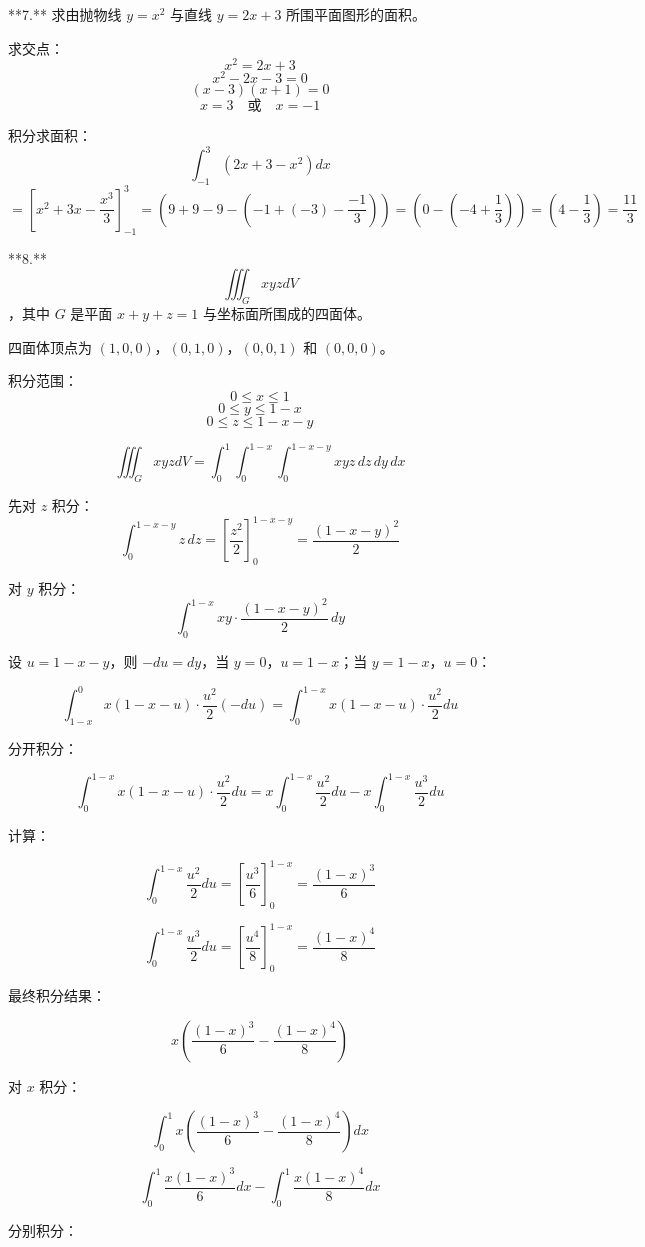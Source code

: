 **7.** 求由抛物线 \(y = x^2\) 与直线 \(y = 2x + 3\) 所围平面图形的面积。

求交点：
\[ x^2 = 2x + 3 \]
\[ x^2 - 2x - 3 = 0 \]
\[ (x - 3)(x + 1) = 0 \]
\[ x = 3 \quad \text{或} \quad x = -1 \]

积分求面积：
\[ \int_{-1}^3 (2x + 3 - x^2) dx \]
\[
= \left[ x^2 + 3x - \frac{x^3}{3} \right]_{-1}^3 
= \left(9 + 9 - 9 - (-1 + (-3) - \frac{-1}{3}) \right)
= \left(0 - (-4 + \frac{1}{3})\right)
= \left(4 - \frac{1}{3}\right)
= \frac{11}{3}
\]

**8.** \[ \iiint_G xyzdV \]，其中 \(G\) 是平面 \(x + y + z = 1\) 与坐标面所围成的四面体。

四面体顶点为 \((1,0,0)\)，\((0,1,0)\)，\((0,0,1)\) 和 \((0,0,0)\)。

积分范围：
\[ 0 \leq x \leq 1 \]
\[ 0 \leq y \leq 1 - x \]
\[ 0 \leq z \leq 1 - x - y \]

\[
\iiint_G xyzdV = \int_0^1 \int_0^{1-x} \int_0^{1-x-y} xyz \, dz \, dy \, dx 
\]

先对 \(z\) 积分：
\[
\int_0^{1-x-y} z \, dz = \left[ \frac{z^2}{2} \right]_0^{1-x-y} = \frac{(1-x-y)^2}{2}
\]

对 \(y\) 积分：
\[
\int_0^{1-x} xy \cdot \frac{(1-x-y)^2}{2} \, dy 
\]

设 \(u = 1-x-y\)，则 \(-du = dy\)，当 \(y = 0\)，\(u = 1-x\)；当 \(y = 1-x\)，\(u = 0\)：

\[
\int_{1-x}^0 x(1-x-u) \cdot \frac{u^2}{2} (-du) = \int_0^{1-x} x (1-x-u) \cdot \frac{u^2}{2} du
\]

分开积分：

\[
\int_0^{1-x} x (1-x-u) \cdot \frac{u^2}{2} du = x \int_0^{1-x} \frac{u^2}{2} du - x \int_0^{1-x} \frac{u^3}{2} du
\]

计算：

\[
\int_0^{1-x} \frac{u^2}{2} du = \left[ \frac{u^3}{6} \right]_0^{1-x} = \frac{(1-x)^3}{6}
\]

\[
\int_0^{1-x} \frac{u^3}{2} du = \left[ \frac{u^4}{8} \right]_0^{1-x} = \frac{(1-x)^4}{8}
\]

最终积分结果：

\[
x \left( \frac{(1-x)^3}{6} - \frac{(1-x)^4}{8} \right)
\]

对 \(x\) 积分：

\[
\int_0^1 x \left( \frac{(1-x)^3}{6} - \frac{(1-x)^4}{8} \right) dx
\]

\[
\int_0^1 \frac{x(1-x)^3}{6} dx - \int_0^1 \frac{x(1-x)^4}{8} dx
\]

分别积分：

